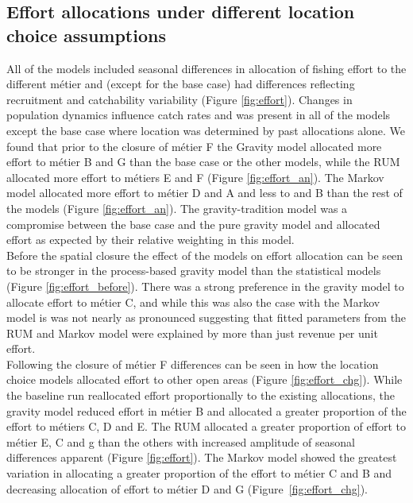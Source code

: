 \documentclass[12pt, halfline, a4paper]{ouparticle}
\begin{document}
\subsection{Effort allocations under different location choice assumptions}

All of the models included seasonal differences in allocation of fishing effort
to the different métier and (except for the base case) had differences
reflecting recruitment and catchability variability (Figure \ref{fig:effort}).
Changes in population dynamics influence catch rates and was present in all of
the models except the base case where location was determined by past
allocations alone. We found that prior to the closure of métier F the Gravity
model allocated more effort to métier B and G than the base case or the other
models, while the RUM allocated more effort to métiers E and F (Figure
\ref{fig:effort_an}). The Markov model allocated more effort to métier D and A
and less to and B than the rest of the models (Figure \ref{fig:effort_an}). The
gravity-tradition model was a compromise between the base case and the pure
gravity model and allocated effort as expected by their relative weighting in
this model. \\

Before the spatial closure the effect of the models on effort allocation can be
seen to be stronger in the process-based gravity model than the statistical
models (Figure \ref{fig:effort_before}). There was a strong preference in the
gravity model to allocate effort to métier C, and while this was also the case
with the Markov model is was not nearly as pronounced suggesting that fitted
parameters from the RUM and Markov model were explained by more than just
revenue per unit effort. \\

Following the closure of métier F differences can be seen in how the location
choice models allocated effort to other open areas (Figure
\ref{fig:effort_chg}). While the baseline run reallocated effort proportionally
to the existing allocations, the gravity model reduced effort in métier B and
allocated a greater proportion of the effort to métiers C, D and E. The RUM
allocated a greater proportion of effort to métier E, C and g than the others
with increased amplitude of seasonal differences apparent (Figure
\ref{fig:effort}). The Markov model showed the greatest variation in allocating
a greater proportion of the effort to métier C and B and decreasing allocation
of effort to métier D and G (Figure~\ref{fig:effort_chg}).
\end{document}
